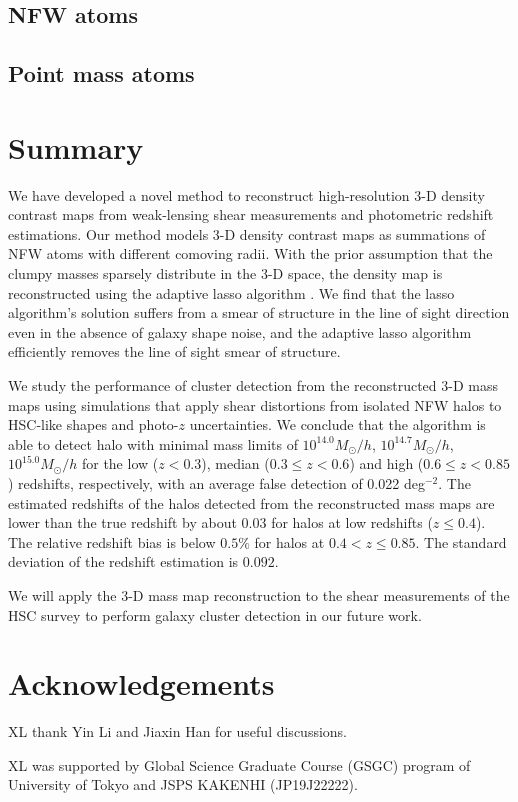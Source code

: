 \documentclass[twocolumn]{aastex63}
\begin{document}
\subsection{NFW atoms}
\label{subsec_test-nfw}


\subsection{Point mass atoms}
\label{subsec_test-pm}




\section{Summary}
\label{sec_Sum}

We have developed a novel method to reconstruct high-resolution $3$-D density
contrast maps from weak-lensing shear measurements and photometric redshift
estimations.  Our method models $3$-D density contrast maps as summations of
NFW atoms with different comoving radii.  With the prior assumption that the
clumpy masses sparsely distribute in the $3$-D space, the density map is
reconstructed using the adaptive lasso algorithm \citep{AdaLASSO-Zou2006}.
We find that the lasso algorithm's solution suffers from a smear of structure
in the line of sight direction even in the absence of galaxy shape noise, and
the adaptive lasso algorithm efficiently removes the line of sight smear of
structure.

We study the performance of cluster detection from the reconstructed $3$-D mass
maps using simulations that apply shear distortions from isolated NFW halos to
HSC-like shapes and photo-$z$ uncertainties.  We conclude that the algorithm is
able to detect halo with minimal mass limits of $10^{14.0} M_{\odot}/h$,
$10^{14.7} M_{\odot}/h$, $10^{15.0} M_{\odot}/h$ for the low ($z<0.3$), median
($0.3\leq z< 0.6$) and high ($0.6\leq z< 0.85$) redshifts, respectively, with an
average false detection of 0.022 deg$^{-2}$. The estimated redshifts of the halos
detected from the reconstructed mass maps are lower than the true redshift by
about $0.03$ for halos at low redshifts ($z\leq 0.4$).  The relative redshift
bias is below $0.5\%$ for halos at $0.4<z\leq 0.85$. The standard deviation of
the redshift estimation is $0.092$.

We will apply the $3$-D mass map reconstruction to the shear measurements of
the HSC survey \citep[e.g.,][]{HSC1-catalog,FPFSHSC1-Li2020} to perform galaxy
cluster detection in our future work.

\section*{Acknowledgements}
XL thank Yin Li and Jiaxin Han for useful discussions.

XL was supported by Global Science Graduate Course (GSGC) program of
University of Tokyo and JSPS KAKENHI (JP19J22222).


\end{document}
